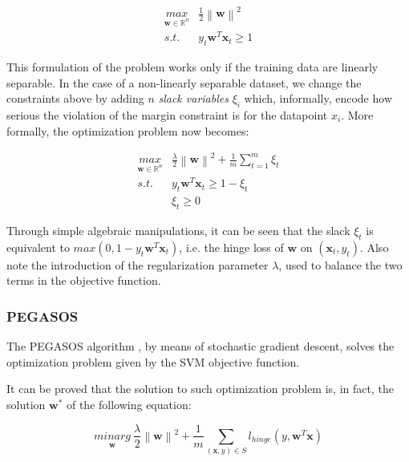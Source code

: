 \documentclass[a4paper]{article}
\begin{document}
\begin{equation}
\begin{matrix}
\underset{\boldsymbol{w} \in \mathbb{R}^n}{max} & \frac{1}{2} \left \| \boldsymbol{w} \right \|^2
\\ 
s.t. & y_t \boldsymbol{w}^T \boldsymbol{x}_t \ge 1
\end{matrix}
\end{equation}

This formulation of the problem works only if the training data are linearly separable. In the case of a non-linearly separable dataset, we change the constraints above by adding \(n\) \emph{slack variables} \(\xi_i\) which, informally, encode how serious the violation of the margin constraint is for the datapoint \(x_i\). More formally, the optimization problem now becomes:

\begin{equation}
\begin{matrix}
\underset{\boldsymbol{w} \in \mathbb{R}^n}{max} & \frac{\lambda}{2} \left \| \boldsymbol{w} \right \|^2 + \frac{1}{m}\sum_{t=1}^{m}{\xi_t}
\\ 
s.t. & y_t \boldsymbol{w}^T \boldsymbol{x}_t \ge 1 - \xi_t
\\
& \xi_t \ge 0
\end{matrix}
\end{equation}

Through simple algebraic manipulations, it can be seen that the slack \(\xi_t\) is equivalent to \(max(0, 1 - y_t \boldsymbol{w}^T \boldsymbol{x}_t)\), i.e. the hinge loss of \(\boldsymbol{w}\) on \((\boldsymbol{x}_t, y_t)\). Also note the introduction of the regularization parameter \(\lambda\), used to balance the two terms in the objective function.

\subsubsection{PEGASOS}
\label{sec:org0221afd}

The PEGASOS algorithm \cite{pegasos}, by means of stochastic gradient descent, solves the optimization problem given by the SVM objective function.

It can be proved that the solution to such optimization problem is, in fact, the solution \(\boldsymbol{w}^*\) of the following equation:

\begin{equation}
\underset{\boldsymbol{w}}{minarg} \:  \frac{\lambda}{2}\left \| \boldsymbol{w} \right \|^2 + \frac{1}{m} \sum_{(\boldsymbol{x},y) \in S} l_{hinge}(y, \boldsymbol{w}^T \boldsymbol{x} )
\end{equation}
\end{document}
